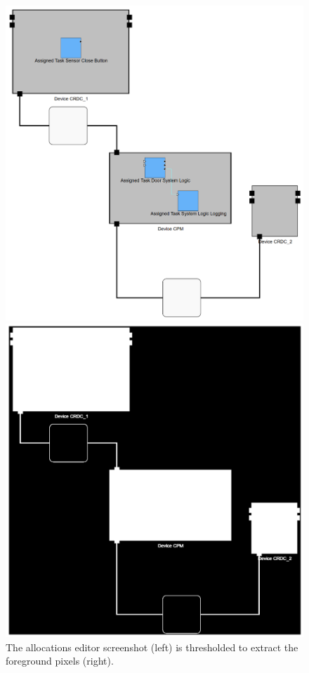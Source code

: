 \begin{figure}[htb]
    \centering
    \begin{minipage}[b]{0.36\textwidth}
        \includegraphics[width=\textwidth]{pictures/foreground_threshold_before.png}
    \end{minipage}
    \hfill
    \begin{minipage}[b]{0.36\textwidth}
        \includegraphics[width=\textwidth]{pictures/foreground_threshold_after.png}
    \end{minipage}
    \caption[Extraction of foreground pixels]{The allocations editor screenshot (left) is thresholded to extract the foreground pixels (right).}
    \label{fig:foreground_threshold}
\end{figure}\\
